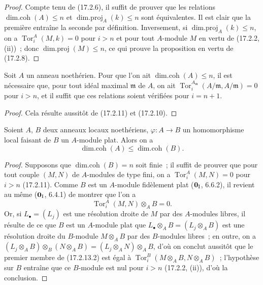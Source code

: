 \begin{proof}
Compte tenu de (17.2.6), il suffit de prouver que les relations
$\operatorname{dim.coh}(A)\leq n$ et
$\operatorname{dim.proj}_A(k)\leq n$ sont équivalentes. Il est clair que la
première entraîne la seconde par définition. Inversement, si
$\operatorname{dim.proj}_A(k)\leq n$, on a
$\operatorname{Tor}^A_i(M,k)=0$ pour $i>n$ et pour tout $A$-module $M$ en
vertu de (17.2.2, (ii))~; donc $\operatorname{dim.proj}(M)\leq n$, ce qui
prouve la proposition en vertu de (17.2.8).
\end{proof}

\begin{corollary}[17.2.12]
\label{0.17.2.12-fr}
Soit $A$ un anneau noethérien. Pour que l'on ait
$\operatorname{dim.coh}(A)\leq n$, il est nécessaire que, pour tout idéal
maximal $\mathfrak{m}$ de $A$, on ait
$\operatorname{Tor}^{A_{\mathfrak{m}}}_i(A/\mathfrak{m},A/\mathfrak{m})=0$
pour $i>n$, et il suffit que ces relations soient vérifiées pour $i=n+1$.
\end{corollary}

\begin{proof}
Cela résulte aussitôt de (17.2.11) et (17.2.10).
\end{proof}

\begin{proposition}[17.2.13]
\label{0.17.2.13-fr}
Soient $A$, $B$ deux anneaux locaux noethériens,
$\varphi:A\longrightarrow B$ un homomorphisme local faisant de $B$ un
$A$-module plat. Alors on a
\begin{equation}
\label{0.17.2.13.1-fr}
\tag{17.2.13.1}
  \operatorname{dim.coh}(A)\leq\operatorname{dim.coh}(B).
\end{equation}
\end{proposition}

\begin{proof}
Supposons que $\operatorname{dim.coh}(B)=n$ soit finie~; il suffit de prouver
que pour tout couple $(M,N)$ de $A$-modules de type fini, on a
$\operatorname{Tor}^A_i(M,N)=0$ pour $i>n$ (17.2.11). Comme $B$ est un
$A$-module fidèlement plat ($\mathbf{0}_{\rm I}$, 6.6.2), il revient au même
($\mathbf{0}_{\rm I}$, 6.4.1) de montrer que l'on a
\begin{equation}
\label{0.17.2.13.2-fr}
\tag{17.2.13.2}
  \operatorname{Tor}^A_i(M,N)\otimes_A B=0.
\end{equation}
Or, si $L_\bullet=(L_j)$ est une résolution droite de $M$ par des $A$-modules
libres, il résulte de ce que $B$ est un $A$-module plat que
$L_\bullet\otimes_A B=(L_j\otimes_A B)$ est une résolution droite du
$B$-module $M\otimes_A B$ par des $B$-modules libres~; en outre, on a
$(L_j\otimes_A B)\otimes_B(N\otimes_A B)
=(L_j\otimes_A N)\otimes_A B$, d'où on conclut aussitôt que le premier membre
de (17.2.13.2) est égal à
$\operatorname{Tor}^B_i(M\otimes_A B,N\otimes_A B)$~; l'hypothèse sur $B$
entraîne que ce $B$-module est nul pour $i>n$ (17.2.2, (ii)), d'où la
conclusion.
\end{proof}

